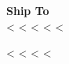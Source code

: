 \parbox[t]{.55\textwidth}{
\textbf{Ship To} \\
<%
<%
<%
<%
<%
}
\parbox[t]{.40\textwidth}{
\vspace*{0.5cm}  
<%
<%
<%
<%
}